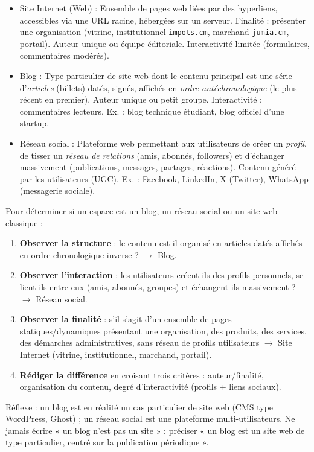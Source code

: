 \documentclass[11pt]{article}
\newcommand{\cle}[1]{{\popxbold\color{popdark}#1}}
\newcounter{popsec}
\newcounter{popsub}
\newcommand{\courssub}[1]{%
  \stepcounter{popsub}%
  \par\vspace{9pt}\noindent{\popxbold\fontsize{11.5}{13}\selectfont\color{popink}{\color{poporange}\thepopsec.\thepopsub}\hspace{6pt}#1}\par\nopagebreak\vspace{4pt}
}
\begin{document}
\courssub{Blog, réseau social et site Internet}

\begin{definition}
\begin{itemize}
\item \cle{Site Internet (Web)} : Ensemble de pages web liées par des hyperliens, accessibles via une URL racine, hébergées sur un serveur. Finalité : présenter une organisation (vitrine, institutionnel \texttt{impots.cm}, marchand \texttt{jumia.cm}, portail). Auteur unique ou équipe éditoriale. Interactivité limitée (formulaires, commentaires modérés).
\item \cle{Blog} : Type particulier de site web dont le contenu principal est une série d'\emph{articles} (billets) datés, signés, affichés en \emph{ordre antéchronologique} (le plus récent en premier). Auteur unique ou petit groupe. Interactivité : commentaires lecteurs. Ex. : blog technique étudiant, blog officiel d'une startup.
\item \cle{Réseau social} : Plateforme web permettant aux utilisateurs de créer un \emph{profil}, de tisser un \emph{réseau de relations} (amis, abonnés, followers) et d'échanger massivement (publications, messages, partages, réactions). Contenu généré par les utilisateurs (UGC). Ex. : Facebook, LinkedIn, X (Twitter), WhatsApp (messagerie sociale).
\end{itemize}
\end{definition}

\begin{methode}
Pour déterminer si un espace est un blog, un réseau social ou un site web classique :
\begin{enumerate}
\item \textbf{Observer la structure} : le contenu est-il organisé en articles datés affichés en ordre chronologique inverse ? $\to$ \cle{Blog}.
\item \textbf{Observer l'interaction} : les utilisateurs créent-ils des profils personnels, se lient-ils entre eux (amis, abonnés, groupes) et échangent-ils massivement ? $\to$ \cle{Réseau social}.
\item \textbf{Observer la finalité} : s'il s'agit d'un ensemble de pages statiques/dynamiques présentant une organisation, des produits, des services, des démarches administratives, sans réseau de profils utilisateurs $\to$ \cle{Site Internet} (vitrine, institutionnel, marchand, portail).
\item \textbf{Rédiger la différence} en croisant trois critères : auteur/finalité, organisation du contenu, degré d'interactivité (profils + liens sociaux).
\end{enumerate}
Réflexe : un blog est en réalité un cas particulier de site web (CMS type WordPress, Ghost) ; un réseau social est une plateforme multi-utilisateurs. Ne jamais écrire « un blog n'est pas un site » : préciser « un blog est un site web de type particulier, centré sur la publication périodique ».
\end{methode}
\end{document}
